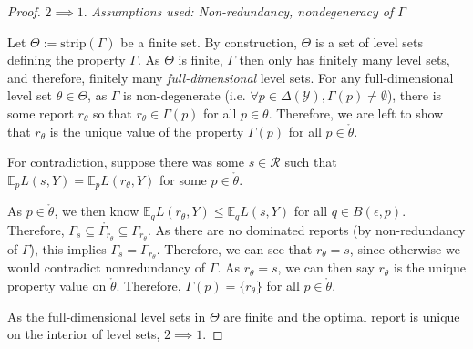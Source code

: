 \documentclass[12pt]{article}
\newcommand{\Comments}{1}
\newcommand{\mynote}[2]{\ifnum\Comments=1\textcolor{#1}{#2}\fi}
\newcommand{\jessie}[1]{\mynote{purple}{[JF: #1]}}
\newcommand{\E}{\mathbb{E}}
\newcommand{\R}{\mathcal{R}}
\newcommand{\Y}{\mathcal{Y}}
\newcommand{\inter}[1]{\mathring{#1}}%
\newcommand{\im}{\text{im}}
\newcommand{\strip}{\text{strip}}
\begin{document}
\begin{proof}





\bigskip
$2 \implies 1$.  
\emph{Assumptions used: Non-redundancy, nondegeneracy of $\Gamma$}

Let $\Theta := \strip(\Gamma)$ be a finite set.
By construction, $\Theta$ is a set of level sets defining the property $\Gamma$.
As $\Theta$ is finite, $\Gamma$ then only has finitely many level sets, and therefore, finitely many \emph{full-dimensional} level sets.
For any full-dimensional level set $\theta \in \Theta$, as $\Gamma$ is non-degenerate (i.e. $\forall p \in \Delta(\Y), \Gamma(p) \neq \emptyset$), there is some report $r_\theta$ so that $r_\theta \in \Gamma(p)$ for all $p \in \theta$.
Therefore, we are left to show that $r_\theta$ is the unique value of the property $\Gamma(p)$ for all $p \in \inter{\theta}$.

For contradiction, suppose there was some $s \in \R$ such that $\E_p L(s,Y) = \E_p L(r_\theta, Y)$ for some $p \in \inter{\theta}$.

As $p \in \inter{\theta}$, we then know $\E_q L(r_\theta, Y) \leq \E_q L(s,Y)$ for all $q \in B(\epsilon, p)$.
Therefore, $\Gamma_s \subseteq \inter{\Gamma_{r_\theta}} \subseteq \Gamma_{r_\theta}$.
As there are no dominated reports (by non-redundancy of $\Gamma$), this implies $\Gamma_s = \Gamma_{r_\theta}$.
Therefore, we can see that $r_\theta = s$, since otherwise we would contradict nonredundancy of $\Gamma$.
As $r_\theta = s$, we can then say $r_\theta$ is the unique property value on $\inter{\theta}$.
Therefore, $\Gamma(p) = \{r_\theta\}$ for all $p \in \inter{\theta}$.

As the full-dimensional level sets in $\Theta$ are finite and the optimal report is unique on the interior of level sets, $2 \implies 1$.

\end{proof}
\end{document}
